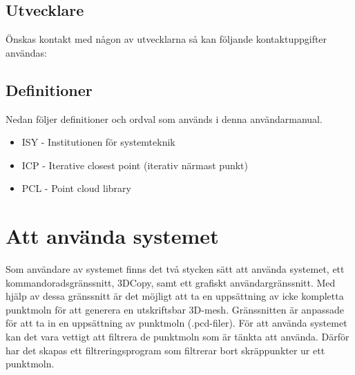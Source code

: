 \documentclass[a4paper,titlepage,12pt]{article}
\begin{document}
	\subsection{Utvecklare}
		Önskas kontakt med någon av utvecklarna så kan följande kontaktuppgifter användas:
		
		
	\subsection{Definitioner}
		Nedan följer definitioner och ordval som används i denna användarmanual.
		
		\begin{itemize}
			\item ISY - Institutionen för systemteknik
			\item ICP - Iterative closest point (iterativ närmast punkt)
			\item PCL - Point cloud library
		\end{itemize}
    
\newpage  

\section{Att använda systemet}
	Som användare av systemet finns det två stycken sätt att använda systemet, ett kommandoradsgränssnitt, 3DCopy, samt ett grafiskt användargränssnitt. Med hjälp av dessa gränssnitt är det möjligt att ta en uppsättning av icke kompletta punktmoln för att generera en utskriftsbar 3D-mesh. Gränssnitten är anpassade för att ta in en uppsättning av punktmoln (.pcd-filer). För att använda systemet kan det vara vettigt att filtrera de punktmoln som är tänkta att använda. Därför har det skapas ett filtreringsprogram som filtrerar bort skräppunkter ur ett punktmoln.
	
\end{document}
